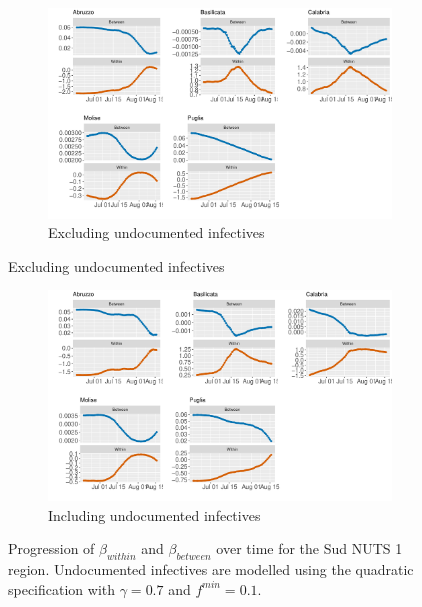 \documentclass[12pt]{article}
\begin{document}
\begin{appendices}
		\begin{figure}[H]
    	    \centering
    	    \begin{subfigure}{\textwidth}
    	      \centering
    	      \includegraphics[width=0.94\linewidth]{output/model_between_lag14_betas_Sud_rolling.pdf}
    	      \caption{Excluding undocumented infectives}
    	      \label{fig:beta_between_over_time_sud_regular}
    	    \end{subfigure}
        \end{figure}
        \begin{figure}[H]\ContinuedFloat
    	    \begin{subfigure}{\textwidth}
    	      \centering
    	      \includegraphics[width=0.94\linewidth]{output/model_between_lag14_betas_Sud_UndocQuadratic_rolling.pdf}
    	      \caption{Including undocumented infectives}
    	      \label{fig:beta_between_over_time_sud_regular_undoc}
    	    \end{subfigure}
    	    \caption{Progression of $\beta_{within}$ and $\beta_{between}$ over time for the Sud NUTS 1 region. Undocumented infectives are modelled using the quadratic specification with $\gamma = 0.7$ and $f^{min}=0.1$.}
    	    \label{fig:beta_between_over_time_sud}
        \end{figure}
		

\end{appendices}
\end{document}
